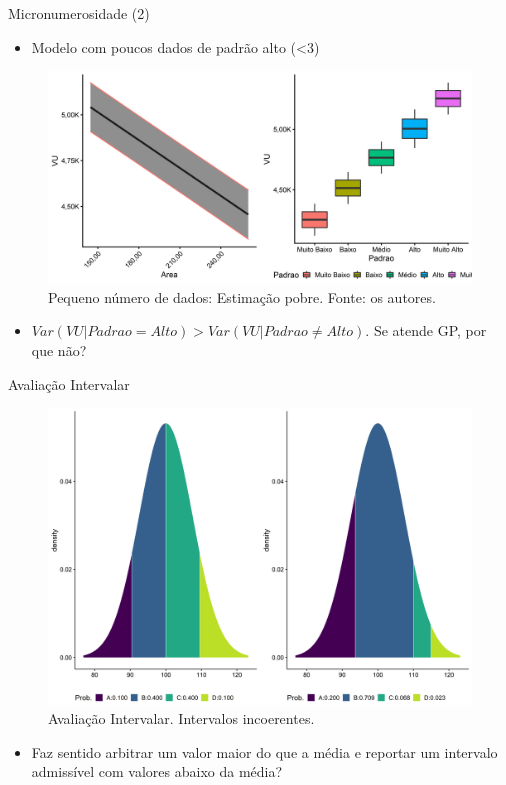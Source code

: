 \documentclass[9pt,ignorenonframetext,aspectratio=169]{beamer}
\providecommand{\tightlist}{%
  \setlength{\itemsep}{0pt}\setlength{\parskip}{0pt}}
\begin{document}
\begin{frame}{Micronumerosidade (2)}
\protect\hypertarget{micronumerosidade-2}{}

\begin{itemize}[<+->]
\tightlist
\item
  \alert<1>{Modelo com poucos dados de padrão alto (<3)}
\end{itemize}

\begin{figure}

{\centering \includegraphics[width=0.7\linewidth]{../../images/modelo1-1} 

}

\caption{Pequeno número de dados: Estimação pobre. Fonte: os autores.}\label{fig:unnamed-chunk-10}
\end{figure}

\begin{itemize}[<+->]
\tightlist
\item
  \alert<2>{$Var(VU|Padrao = Alto) > Var(VU| Padrao \ne Alto)$. Se atende GP, por que não?}
\end{itemize}

\end{frame}

\begin{frame}{Avaliação Intervalar}
\protect\hypertarget{avaliauxe7uxe3o-intervalar}{}

\begin{figure}

{\centering \includegraphics[width=0.5\linewidth]{images/avalInterv-1} 

}

\caption{Avaliação Intervalar. Intervalos incoerentes.}\label{fig:avalInterv}
\end{figure}

\begin{itemize}[<+->]
\tightlist
\item
  Faz sentido arbitrar um valor maior do que a média e reportar um
  intervalo admissível com valores abaixo da média?
\end{itemize}

\end{frame}
\end{document}
